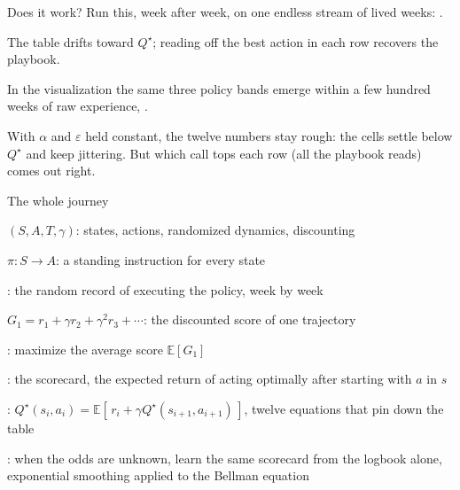 \begin{frame}{Does it work?}
Run this, week after week, on one endless stream of lived weeks: .
\begin{bullets}
\item The table drifts toward $Q^\star$; reading off the best action in each row recovers the playbook.
\item In the visualization the same three policy bands emerge within a few hundred weeks of raw experience, .
\end{bullets}
\pause
\begin{alertbox}
With $\alpha$ and $\varepsilon$ held constant, the twelve numbers stay rough: the cells settle below $Q^\star$ and keep jittering. But which call tops each row (all the playbook reads) comes out right.
\end{alertbox}
\end{frame}


\begin{frame}{The whole journey}
\begin{bullets}
\item {} $(S, A, T, \gamma)$: states, actions, randomized dynamics, discounting
\item {} $\pi\colon S \to A$: a standing instruction for every state
\item {}: the random record of executing the policy, week by week
\item {} $G_1 = r_1 + \gamma r_2 + \gamma^2 r_3 + \cdots$: the discounted score of one trajectory
\item {}: maximize the average score $\mathbb{E}[G_1]$
\item {}: the scorecard, the expected return of acting optimally after starting with $a$ in $s$
\item {}: $Q^\star(s_i,a_i) = \mathbb{E}[\, r_i + \gamma Q^\star(s_{i+1},a_{i+1})\,]$, twelve equations that pin down the table
\item {}: when the odds are unknown, learn the same scorecard from the logbook alone, exponential smoothing applied to the Bellman equation
\end{bullets}
\end{frame}

